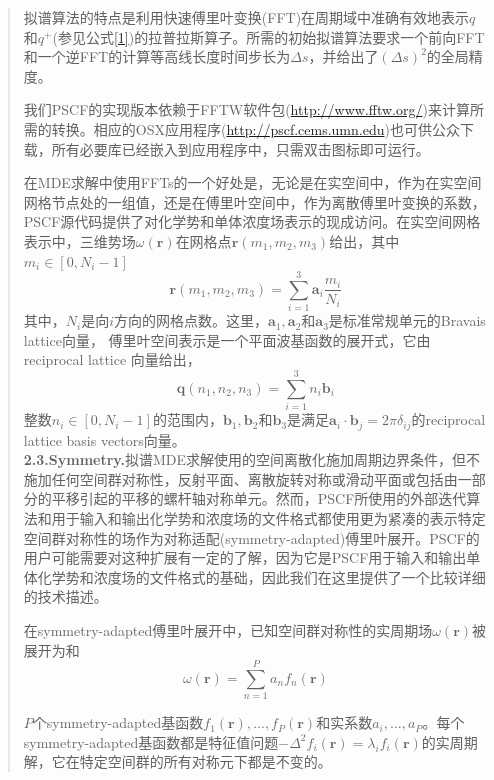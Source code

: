 \documentclass{article}
\begin{document}
\begin{CJK}{UTF8}{gkai}
\begin{quotation}
拟谱算法的特点是利用快速傅里叶变换(FFT)在周期域中准确有效地表示$q$和$q^{+}$(参见公式\ref{1})的拉普拉斯算子。所需的初始拟谱算法要求一个前向FFT和一个逆FFT的计算等高线长度时间步长为$\Delta s$，并给出了$(\Delta s)^2$的全局精度。

我们PSCF的实现版本依赖于FFTW软件包(\url{http://www.fftw.org/})来计算所需的转换。相应的OSX应用程序(\url{http://pscf.cems.umn.edu})也可供公众下载，所有必要库已经嵌入到应用程序中，只需双击图标即可运行。

在MDE求解中使用FFTs的一个好处是，无论是在实空间中，作为在实空间网格节点处的一组值，还是在傅里叶空间中，作为离散傅里叶变换的系数，PSCF源代码提供了对化学势和单体浓度场表示的现成访问。在实空间网格表示中，三维势场$\omega (\mathbf{r})$在网格点$\mathbf{r}(m_1,m_2,m_3)$给出，其中$m_i \in \left[ 0,N_i-1 \right]$
\begin{equation}\label{8}
\mathbf{r}(m_1,m_2,m_3)=\sum _{i=1}^{3}\mathbf{a}_i \frac{m_i}{N_i}
\end{equation}
其中，$N_i$是向$i$方向的网格点数。这里，$\mathbf{a}_1,\mathbf{a}_2$和$\mathbf{a}_3$是标准常规单元的Bravais lattice向量，
傅里叶空间表示是一个平面波基函数的展开式，它由reciprocal lattice 向量给出，
\begin{equation}\label{9}
\mathbf{q}(n_1,n_2,n_3)=\sum _{i=1}^{3}n_i\mathbf{b}_i
\end{equation}
整数$n_i\in[0,N_i-1]$的范围内，$\mathbf{b}_1,\mathbf{b}_2$和$\mathbf{b}_3$是满足$\mathbf{a}_i \cdot \mathbf{b}_j=2\pi \delta _{ij}$的reciprocal lattice basis vectors向量。\\
\textbf{2.3.Symmetry.}拟谱MDE求解使用的空间离散化施加周期边界条件，但不施加任何空间群对称性，反射平面、离散旋转对称或滑动平面或包括由一部分的平移引起的平移的螺杆轴对称单元。然而，PSCF所使用的外部迭代算法和用于输入和输出化学势和浓度场的文件格式都使用更为紧凑的表示特定空间群对称性的场作为对称适配(symmetry-adapted)傅里叶展开。PSCF的用户可能需要对这种扩展有一定的了解，因为它是PSCF用于输入和输出单体化学势和浓度场的文件格式的基础，因此我们在这里提供了一个比较详细的技术描述。

在symmetry-adapted傅里叶展开中，已知空间群对称性的实周期场$\omega (\mathbf{r})$被展开为和
\begin{equation}\label{10}
\omega (\mathbf{r})=\sum _{n=1}^{P} a_nf_n(\mathbf{r})
\end{equation}

$P$个symmetry-adapted基函数$f_1(\mathbf{r}),...,f_P(\mathbf{r})$和实系数$a_i,...,a_P$。每个symmetry-adapted基函数都是特征值问题$-\Delta ^2f_i(\mathbf{r})=\lambda _if_i(\mathbf{r})$的实周期解，它在特定空间群的所有对称元下都是不变的。


\end{quotation}
\end{CJK}
\end{document}
